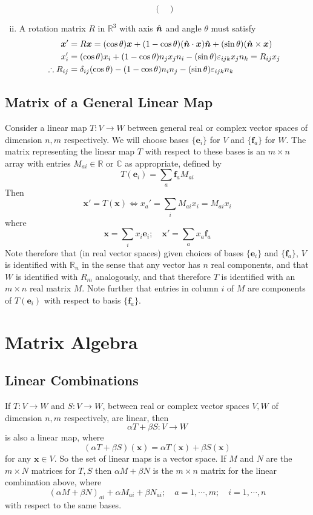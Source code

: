\documentclass{article}
\begin{document}
\begin{enumerate}[(i)]
\[\begin{pmatrix}
		      \end{pmatrix} \]
	\item A rotation matrix $R$ in $\mathbb R^3$ with axis $\hat{\bm n}$ and angle $\theta$ must satisfy
	      \begin{align*}
		      \bm x'            & = R\bm x = (\cos \theta)\bm x + (1 - \cos \theta)(\hat{\bm n} \cdot \bm x)\hat{\bm n} + (\sin \theta)(\hat{\bm n} \times \bm x) \\
		      x_i'              & = (\cos \theta)x_i + (1 - \cos \theta)n_j x_j n_i - (\sin \theta) \varepsilon_{ijk}x_j n_k = R_{ij} x_j       \\
		      \therefore R_{ij} & = \delta_{ij}(\cos \theta) - (1 - \cos \theta)n_in_j - (\sin \theta)\varepsilon_{ijk} n_k
	      \end{align*}
\end{enumerate}

\subsection{Matrix of a General Linear Map}
Consider a linear map $T: V \to W$ between general real or complex vector spaces of dimension $n, m$ respectively. We will choose bases $\{ \bm e_i \}$ for $V$ and $\{ \bm f_a \}$ for $W$. The matrix representing the linear map $T$ with respect to these bases is an $m \times n$ array with entries $M_{ai} \in \mathbb R$ or $\mathbb C$ as appropriate, defined by
\[ T(\bm e_i) = \sum_a \bm f_a M_{ai} \]
Then
\[ \bm x' = T(\bm x) \iff x_a' = \sum_i M_{ai}x_i = M_{ai}x_i \]
where
\[ \bm x = \sum_i x_i \bm e_i;\quad \bm x' = \sum_a x_a \bm f_a \]
Note therefore that (in real vector spaces) given choices of bases $\{ \bm e_i \}$ and $\{ \bm f_a \}$, $V$ is identified with $\mathbb R_n$ in the sense that any vector has $n$ real components, and that $W$ is identified with $R_m$ analogously, and that therefore $T$ is identified with an $m\times n$ real matrix $M$. Note further that entries in column $i$ of $M$ are components of $T(\bm e_i)$ with respect to basis $\{ \bm f_a \}$.

\section{Matrix Algebra}
\subsection{Linear Combinations}
If $T: V \to W$ and $S: V \to W$, between real or complex vector spaces $V, W$ of dimension $n, m$ respectively, are linear, then
\[ \alpha T + \beta S: V \to W \]
is also a linear map, where
\[ (\alpha T + \beta S)(\bm x) = \alpha T(\bm x) + \beta S(\bm x) \]
for any $\bm x \in V$. So the set of linear maps is a vector space. If $M$ and $N$ are the $m\times N$ matrices for $T, S$ then $\alpha M + \beta N$ is the $m\times n$ matrix for the linear combination above, where
\[ (\alpha M + \beta N)_{ai} + \alpha M_{ai} + \beta N_{ai};\quad a = 1, \cdots, m;\quad i = 1, \cdots, n \]
with respect to the same bases.
\end{document}
